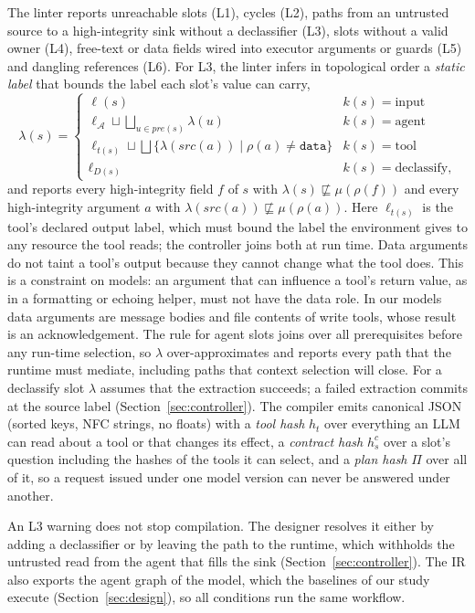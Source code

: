 \documentclass[pdflatex,sn-mathphys-num]{sn-jnl}
\theoremstyle{thmstyleone}%
\theoremstyle{thmstyletwo}%
\theoremstyle{thmstylethree}%
\begin{document}
The linter reports unreachable slots (L1), cycles (L2), paths from an untrusted source to a high-integrity sink without a declassifier (L3), slots without a valid owner (L4), free-text or data fields wired into executor arguments or guards (L5) and dangling references (L6). For L3, the linter infers in topological order a \emph{static label} that bounds the label each slot's value can carry,
\[ \lambda(s) = \begin{cases} \ell(s) & k(s) = \text{input} \\ \ell_{\mathcal{A}} \sqcup \bigsqcup_{u \in \mathit{pre}(s)} \lambda(u) & k(s) = \text{agent} \\ \ell_{t(s)} \sqcup \bigsqcup \{\lambda(\mathit{src}(a)) \mid \rho(a) \neq \texttt{data}\} & k(s) = \text{tool} \\ \ell_{D(s)} & k(s) = \text{declassify,} \end{cases} \]
and reports every high-integrity field $f$ of $s$ with $\lambda(s) \not\sqsubseteq \mu(\rho(f))$ and every high-integrity argument $a$ with $\lambda(\mathit{src}(a)) \not\sqsubseteq \mu(\rho(a))$. Here $\ell_{t(s)}$ is the tool's declared output label, which must bound the label the environment gives to any resource the tool reads; the controller joins both at run time. Data arguments do not taint a tool's output because they cannot change what the tool does. This is a constraint on models: an argument that can influence a tool's return value, as in a formatting or echoing helper, must not have the data role. In our models data arguments are message bodies and file contents of write tools, whose result is an acknowledgement. The rule for agent slots joins over all prerequisites before any run-time selection, so $\lambda$ over-approximates and reports every path that the runtime must mediate, including paths that context selection will close. For a declassify slot $\lambda$ assumes that the extraction succeeds; a failed extraction commits at the source label (Section~\ref{sec:controller}). The compiler emits canonical JSON (sorted keys, NFC strings, no floats) with a \emph{tool hash} $h_t$ over everything an LLM can read about a tool or that changes its effect, a \emph{contract hash} $h^c_s$ over a slot's question including the hashes of the tools it can select, and a \emph{plan hash} $\Pi$ over all of it, so a request issued under one model version can never be answered under another.

An L3 warning does not stop compilation. The designer resolves it either by adding a declassifier or by leaving the path to the runtime, which withholds the untrusted read from the agent that fills the sink (Section~\ref{sec:controller}). The IR also exports the agent graph of the model, which the baselines of our study execute (Section~\ref{sec:design}), so all conditions run the same workflow.
\end{document}
